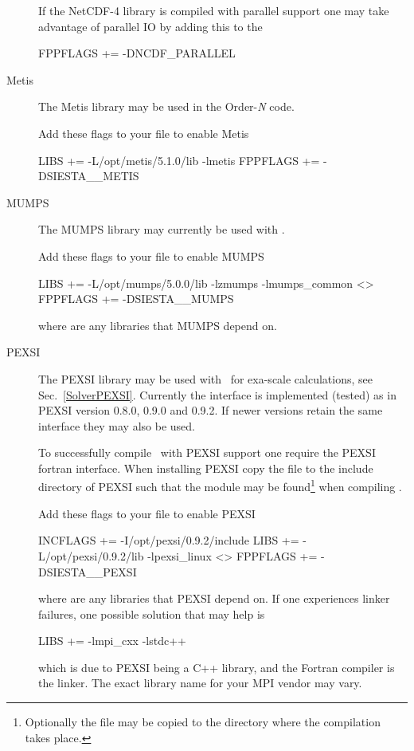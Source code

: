 \begin{description}
  
  If the NetCDF-4 library is compiled with parallel support one may
  take advantage of parallel IO by adding this to the  
\begin{shellexample}
  FPPFLAGS += -DNCDF_PARALLEL
\end{shellexample}


  \item[Metis]%
  The Metis library may be used in the Order-\emph N code. 

  Add these flags to your  file to enable Metis
\begin{shellexample}
  LIBS += -L/opt/metis/5.1.0/lib -lmetis
  FPPFLAGS += -DSIESTA__METIS
\end{shellexample}


  \item[MUMPS]%
  The MUMPS library may currently be used with \tsiesta.
  
  Add these flags to your  file to enable MUMPS
\begin{shellexample}
  LIBS += -L/opt/mumps/5.0.0/lib -lzmumps -lmumps_common <>
  FPPFLAGS += -DSIESTA__MUMPS
\end{shellexample}
  where \shell{<>} are any libraries that MUMPS depend on.


  \item[PEXSI]%
  The PEXSI library may be used with \siesta\ for exa-scale
  calculations, see Sec.~\ref{SolverPEXSI}. Currently the interface is
  implemented (tested) as in PEXSI version 0.8.0, 0.9.0 and 0.9.2. If
  newer versions retain the same interface they may also be used.

  To successfully compile \siesta\ with PEXSI support one require the
  PEXSI fortran interface. When installing PEXSI copy the
   file to the include directory of
  PEXSI such that the module may be found\footnote{Optionally the file
      may be copied to the  directory where the compilation
      takes place.} when compiling \siesta.

  Add these flags to your  file to enable PEXSI
\begin{shellexample}
  INCFLAGS += -I/opt/pexsi/0.9.2/include
  LIBS += -L/opt/pexsi/0.9.2/lib -lpexsi_linux <>
  FPPFLAGS += -DSIESTA__PEXSI
\end{shellexample}
  where \shell{<>} are any libraries that PEXSI depend on. 
  If one experiences linker failures, one possible solution that may
  help is
\begin{shellexample}
  LIBS += -lmpi_cxx -lstdc++
\end{shellexample}
  which is due to PEXSI being a C++ library, and the Fortran compiler
  is the linker. The exact library name for your MPI vendor may
  vary. 


\end{description}
